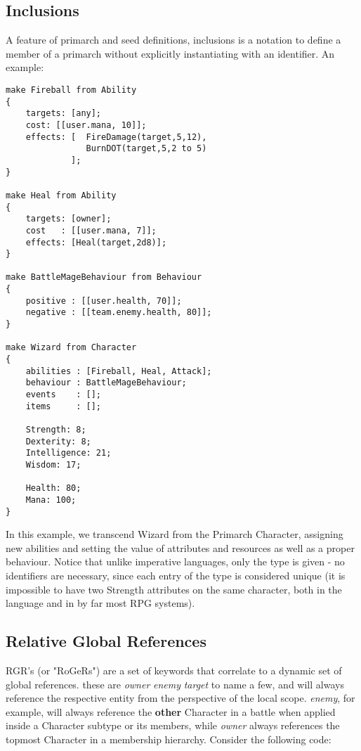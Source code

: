 \subsection{Inclusions}
A feature of primarch and seed definitions, inclusions  is a notation to define a member of a primarch without explicitly instantiating with an identifier. An example:
\begin{lstlisting}
make Fireball from Ability
{
	targets: [any];
	cost: [[user.mana, 10]];
	effects: [	FireDamage(target,5,12),
				BurnDOT(target,5,2 to 5)
			 ];
}

make Heal from Ability
{
	targets: [owner];
	cost   : [[user.mana, 7]];
	effects: [Heal(target,2d8)];
}

make BattleMageBehaviour from Behaviour
{
	positive : [[user.health, 70]];
	negative : [[team.enemy.health, 80]];
}

make Wizard from Character
{
	abilities : [Fireball, Heal, Attack];
	behaviour : BattleMageBehaviour;
	events    : [];
	items     : [];
                 
    Strength: 8;
    Dexterity: 8;
    Intelligence: 21;
    Wisdom: 17;
    
    Health: 80;
    Mana: 100;
}
\end{lstlisting}

In this example, we transcend Wizard from the Primarch Character, assigning new abilities and setting the value of attributes and resources as well as a proper behaviour. Notice that unlike imperative languages, only the type is given - no identifiers are necessary, since each entry of the type is considered unique (it is impossible to have two Strength attributes on the same character, both in the language and in by far most RPG systems).

\subsection{Relative Global References}
RGR's (or "RoGeRs") are a set of keywords that correlate to a dynamic set of global references. these are \emph{owner} \emph{enemy} \emph{target} to name a few, and will always reference the respective entity from the perspective of the local scope. \emph{enemy}, for example, will always reference the \textbf{other} Character in a battle when applied inside a Character subtype or its members, while \emph{owner} always references the topmost Character in a membership hierarchy. Consider the following code:

